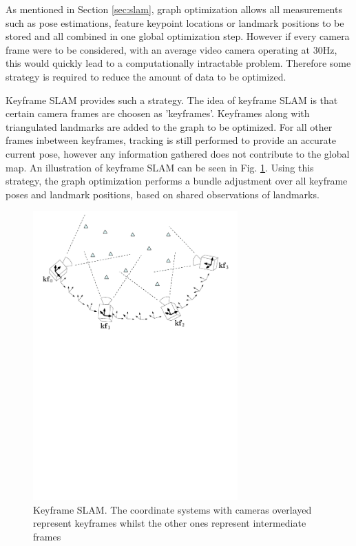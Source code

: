 As mentioned in Section \ref{sec:slam}, graph optimization allows all measurements such as pose estimations, feature keypoint locations or landmark positions to be stored and all combined in one global optimization step.  However if every camera frame were to be considered, with an average video camera operating at 30Hz, this would quickly lead to a computationally intractable problem.  Therefore some strategy is required to reduce the amount of data to be optimized.

Keyframe SLAM provides such a strategy.  The idea of keyframe SLAM is that certain camera frames are choosen as 'keyframes'.  Keyframes along with triangulated landmarks are added to the graph to be optimized.  For all other frames inbetween keyframes, tracking is still performed to provide an accurate current pose, however any information gathered does not contribute to the global map.  An illustration of keyframe SLAM can be seen in Fig. \ref{fig:keyframe_slam}.  Using this strategy, the graph optimization performs a bundle adjustment over all keyframe poses and landmark positions, based on shared observations of landmarks. 

\begin{figure}[h]
  \centering
    \includegraphics[width=0.7\textwidth]{chapters/images/keyframes}
  \caption{Keyframe SLAM.  The coordinate systems with cameras overlayed represent keyframes whilst the other ones represent intermediate frames}
  \label{fig:keyframe_slam}
\end{figure}

